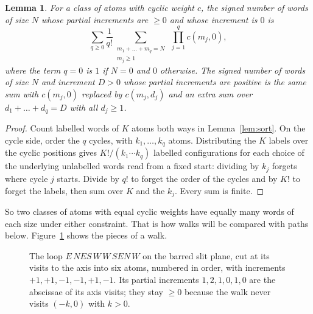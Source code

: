 \documentclass[11pt]{amsart}
\newtheorem{lemma}[theorem]{Lemma}
\theoremstyle{definition}
\theoremstyle{remark}
\begin{document}
\begin{lemma}\label{lem:count}
For a class of atoms with cyclic weight $c$, the signed number of words of size $N$ whose partial increments are $\ge0$
and whose increment is $0$ is
\[
  \sum_{q\ge0}\frac1{q!}\sum_{\substack{m_1+\dots+m_q=N\\ m_j\ge1}}\ \prod_{j=1}^q c(m_j,0),
\]
where the term $q=0$ is $1$ if $N=0$ and $0$ otherwise. The signed number of words of size $N$ and increment $D>0$
whose partial increments are positive is the same sum with $c(m_j,0)$ replaced by $c(m_j,d_j)$ and an extra sum over
$d_1+\dots+d_q=D$ with all $d_j\ge1$.
\end{lemma}

\begin{proof}
Count labelled words of $K$ atoms both ways in Lemma~\ref{lem:sort}. On the cycle side, order the $q$ cycles, with
$k_1,\dots,k_q$ atoms. Distributing the $K$ labels over the cyclic positions gives $K!/(k_1\cdots k_q)$ labelled
configurations for each choice of the underlying unlabelled words read from a fixed start: dividing by $k_j$ forgets
where cycle $j$ starts. Divide by $q!$ to forget the order of the cycles and by $K!$ to forget the labels, then sum over
$K$ and the $k_j$. Every sum is finite.
\end{proof}

So two classes of atoms with equal cyclic weights have equally many words of each size under either constraint. That is
how walks will be compared with paths below. Figure~\ref{fig:loop} shows the pieces of a walk.

\begin{figure}[ht]
\centering
{}
\caption{The loop $E\,NES\,W\,W\,SEN\,W$ on the barred slit plane, cut at its visits to the axis into six atoms,
numbered in order, with increments $+1,+1,-1,-1,+1,-1$. Its partial increments $1,2,1,0,1,0$ are the abscissae of its axis visits; they stay
$\ge0$ because the walk never visits $(-k,0)$ with $k>0$.}
\label{fig:loop}
\end{figure}
\end{document}
